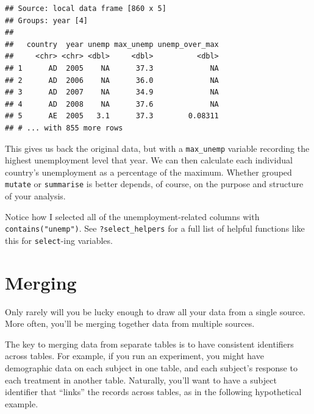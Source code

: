 \documentclass[12pt,oneside,openany]{book}
\newenvironment{Shaded}{\begin{snugshade}}{\end{snugshade}}
\newcommand{\KeywordTok}[1]{\textcolor[rgb]{0.13,0.29,0.53}{\textbf{#1}}}
\newcommand{\DataTypeTok}[1]{\textcolor[rgb]{0.13,0.29,0.53}{#1}}
\newcommand{\StringTok}[1]{\textcolor[rgb]{0.31,0.60,0.02}{#1}}
\newcommand{\OtherTok}[1]{\textcolor[rgb]{0.56,0.35,0.01}{#1}}
\newcommand{\OperatorTok}[1]{\textcolor[rgb]{0.81,0.36,0.00}{\textbf{#1}}}
\newcommand{\NormalTok}[1]{#1}
\begin{document}
\begin{Shaded}
\end{Shaded}

\begin{verbatim}
## Source: local data frame [860 x 5]
## Groups: year [4]
## 
##   country  year unemp max_unemp unemp_over_max
##     <chr> <chr> <dbl>     <dbl>          <dbl>
## 1      AD  2005    NA      37.3             NA
## 2      AD  2006    NA      36.0             NA
## 3      AD  2007    NA      34.9             NA
## 4      AD  2008    NA      37.6             NA
## 5      AE  2005   3.1      37.3        0.08311
## # ... with 855 more rows
\end{verbatim}

This gives us back the original data, but with a \texttt{max\_unemp}
variable recording the highest unemployment level that year. We can then
calculate each individual country's unemployment as a percentage of the
maximum. Whether grouped \texttt{mutate} or \texttt{summarise} is better
depends, of course, on the purpose and structure of your analysis.

Notice how I selected all of the unemployment-related columns with
\texttt{contains("unemp")}. See \texttt{?select\_helpers} for a full
list of helpful functions like this for \texttt{select}-ing variables.

\section{Merging}\label{merging}

Only rarely will you be lucky enough to draw all your data from a single
source. More often, you'll be merging together data from multiple
sources.

The key to merging data from separate tables is to have consistent
identifiers across tables. For example, if you run an experiment, you
might have demographic data on each subject in one table, and each
subject's response to each treatment in another table. Naturally, you'll
want to have a subject identifier that ``links'' the records across
tables, as in the following hypothetical example.
\end{document}
